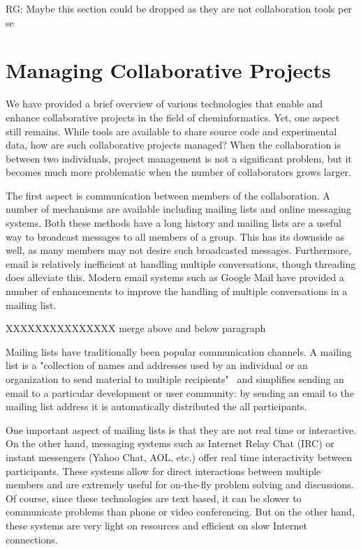 \documentclass[11pt]{book}
\newcommand{\rg}[1]{{\color{red} RG: #1}}
\begin{document}
\rg{Maybe this section could be dropped as they are not collaboration
  tools per se}

\section{Managing Collaborative Projects}

We have provided a brief overview of various technologies that enable
and enhance collaborative projects in the field of
cheminformatics. Yet, one aspect still remains. While tools are
available to share source code and experimental data, how are such
collaborative projects managed? When the collaboration is between two
individuals, project management is not a significant problem, but it
becomes much more problematic when the number of collaborators grows
larger.

The first aspect is communication between members of the
collaboration. A number of mechanisms are available including mailing
lists and online messaging systems. Both these methods have a long
history and mailing lists are a useful way to broadcast messages to
all members of a group. This has its downside as well, as many members
may not desire such broadcasted messages. Furthermore, email is
relatively inefficient at handling multiple conversations, though
threading does alleviate this. Modern email systems such as
Google Mail have provided a number of enhancements to improve the
handling of multiple conversations in a mailing list. 

XXXXXXXXXXXXXXX merge above and below paragraph

Mailing lists have 
traditionally been popular communication channels. A mailing
list is a "collection of names and addresses used by an individual
or an organization to send material to multiple recipients"~\cite{wp:mailinglist}
and simplifies sending an email to a particular development or
user community: by sending an email to the mailing list address
it is automatically distributed the all participants.

One important aspect of mailing lists is that they are not real time
or interactive. On the other hand, messaging systems such as Internet
Relay Chat (IRC) or instant messengers (Yahoo Chat, AOL, etc.) offer
real time interactivity between participants. These systems allow for
direct interactions between multiple members and are extremely useful
for on-the-fly problem solving and discussions. Of course, since these
technologies are text based, it can be slower to communicate problems 
than phone or video
conferencing. But on the other hand, these systems are very light on
resources and efficient on slow Internet connections.
\end{document}
